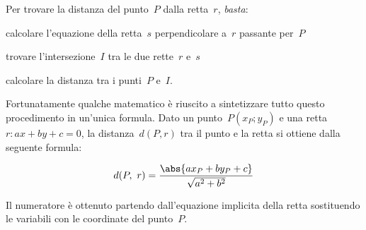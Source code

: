 \begin{procedura}
 Per trovare la distanza del punto~\(P\) dalla retta~\(r\), \emph{basta}:
 \begin{enumeratea}
  \item calcolare l'equazione della retta~\(s\) perpendicolare a~\(r\) passante 
   per~\(P\)
  \item trovare l'intersezione~\(I\) tra le due rette~\(r\) e~\(s\)
  \item calcolare la distanza tra i punti~\(P\) e~\(I\).
 \end{enumeratea}
\end{procedura}

Fortunatamente qualche matematico è riuscito a sintetizzare tutto questo 
procedimento in un'unica formula. 
Dato un punto~\(P(x_P; y_P)\) e 
una retta~\(r: ax+by+c=0\),
la distanza~\(d(P, r)\) tra il punto e la retta si ottiene
dalla seguente formula:

\[d(P,~r) = \dfrac{\abs{ax_P +by_P + c}}{\sqrt{a^2 + b^2}}\]

Il numeratore è ottenuto partendo dall'equazione implicita della retta 
sostituendo le variabili con le coordinate del punto~\(P\).

\begin{comment}
Per evitare l'indentazione con le minipage:

\documentclass{article}

\fboxsep=0pt
\noindent\fbox{%
\begin{minipage}[t]{0.48\linewidth}
left part
\end{minipage}}%
\hfill%
\fbox{%
\begin{minipage}[t]{0.48\linewidth}
right part
\end{minipage}
}

 
\end{comment}

